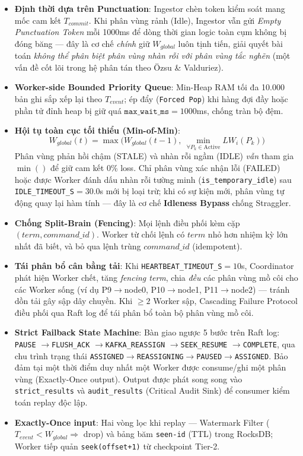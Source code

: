 \documentclass[9pt,a4paper]{article}
\begin{document}
\begin{itemize}[leftmargin=*]
    \item \textbf{Định thời dựa trên Punctuation}: Ingestor chèn token kiểm soát mang mốc cam kết $T_{commit}$. Khi phân vùng rảnh (Idle), Ingestor vẫn gửi \emph{Empty Punctuation Token} mỗi 1000ms để dòng thời gian logic toàn cụm không bị đóng băng --- đây là cơ chế \emph{chính} giữ $W_{global}$ luôn tịnh tiến, giải quyết bài toán \emph{không thể phân biệt phân vùng nhàn rỗi với phân vùng tắc nghẽn} (một vấn đề cốt lõi trong hệ phân tán theo Özsu \& Valduriez).
    \item \textbf{Worker-side Bounded Priority Queue}: Min-Heap RAM tối đa 10.000 bản ghi sắp xếp lại theo $T_{event}$; ép đẩy (\texttt{Forced Pop}) khi hàng đợi đầy hoặc phần tử đỉnh heap bị giữ quá $\texttt{max\_wait\_ms}=1000$ms, chống tràn bộ đệm.
    \item \textbf{Hội tụ toàn cục tối thiểu (Min-of-Min)}:
    {\large
    \begin{equation}
    \boxed{W_{global}(t) = \max\Big(W_{global}(t{-}1),\ \min_{\forall P_k \in \text{Active}} LW_i(P_k)\Big)}
    \end{equation}
    }
    Phân vùng phản hồi chậm (STALE) và nhàn rỗi ngầm (IDLE) \emph{vẫn} tham gia $\min()$ để giữ cam kết 0\% loss. Chỉ phân vùng xác nhận lỗi (FAILED) hoặc được Worker đánh dấu nhàn rỗi tường minh (\texttt{is\_temporary\_idle}) sau \texttt{IDLE\_TIMEOUT\_S}$=30.0$s mới bị loại trừ; khi có sự kiện mới, phân vùng tự động quay lại hàm tính --- đây là cơ chế \textbf{Idleness Bypass} chống Straggler.
    \item \textbf{Chống Split-Brain (Fencing)}: Mọi lệnh điều phối kèm cặp $(term, command\_id)$. Worker từ chối lệnh có $term$ nhỏ hơn nhiệm kỳ lớn nhất đã biết, và bỏ qua lệnh trùng $command\_id$ (idempotent).
    \item \textbf{Tái phân bổ cân bằng tải}: Khi \texttt{HEARTBEAT\_TIMEOUT\_S}$=10$s, Coordinator phát hiện Worker chết, tăng \emph{fencing term}, chia \emph{đều} các phân vùng mồ côi cho các Worker sống (ví dụ P9$\to$node0, P10$\to$node1, P11$\to$node2) --- tránh dồn tải gây sập dây chuyền. Khi $\ge 2$ Worker sập, Cascading Failure Protocol điều phối qua Raft log để tái phân bổ toàn bộ phân vùng mồ côi.
    \item \textbf{Strict Failback State Machine}: Bàn giao ngược 5 bước trên Raft log: \texttt{PAUSE} $\to$\allowbreak \texttt{FLUSH\_ACK} $\to$\allowbreak \texttt{KAFKA\_REASSIGN} $\to$\allowbreak \texttt{SEEK\_RESUME} $\to$\allowbreak \texttt{COMPLETE}, qua chu trình trạng thái \texttt{ASSIGNED}$\to$\allowbreak\texttt{REASSIGNING}$\to$\allowbreak\texttt{PAUSED}$\to$\allowbreak\texttt{ASSIGNED}. Bảo đảm tại một thời điểm duy nhất một Worker được consume/ghi một phân vùng (Exactly-Once output). Output được phát song song vào \texttt{strict\_results} và \texttt{audit\_results} (Critical Audit Sink) để consumer kiểm toán replay độc lập.
    \item \textbf{Exactly-Once input}: Hai vòng lọc khi replay --- Watermark Filter ($T_{event}<W_{global}\Rightarrow$ drop) và bảng băm \texttt{seen-id} (TTL) trong RocksDB; Worker tiếp quản \texttt{seek(offset+1)} từ checkpoint Tier-2.
\end{itemize}
\end{document}
